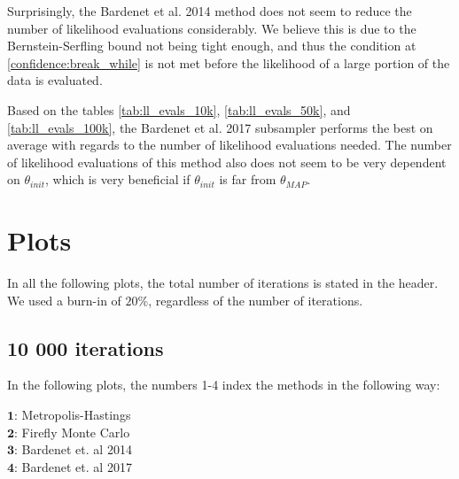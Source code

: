 Surprisingly, the Bardenet et al. 2014 method does not seem to reduce the number of likelihood evaluations considerably. We believe this is due to the Bernstein-Serfling bound not being tight enough, and thus the condition at \ref{confidence:break_while} is not met before the likelihood of a large portion of the data is evaluated. 

Based on the tables \ref{tab:ll_evals_10k}, \ref{tab:ll_evals_50k}, and \ref{tab:ll_evals_100k}, the Bardenet et al. 2017 subsampler performs the best on average with regards to the number of likelihood evaluations needed. The number of likelihood evaluations of this method also does not seem to be very dependent on $\theta_{init}$, which is very beneficial if $\theta_{init}$ is far from $\theta_{MAP}$. 



\section{Plots}
In all the following plots, the total number of iterations is stated in the header. We used a burn-in of $20\%$, regardless of the number of iterations. 
\subsection{10 000 iterations}
In the following plots, the numbers 1-4 index the methods in the following way: \\
\begin{centering}
$\mathbf{1}$:  Metropolis-Hastings \\
$\mathbf{2}$: Firefly Monte Carlo  \\
$\mathbf{3}$: Bardenet et. al 2014 \\
$\mathbf{4}$: Bardenet et. al 2017 \\
\end{centering}


